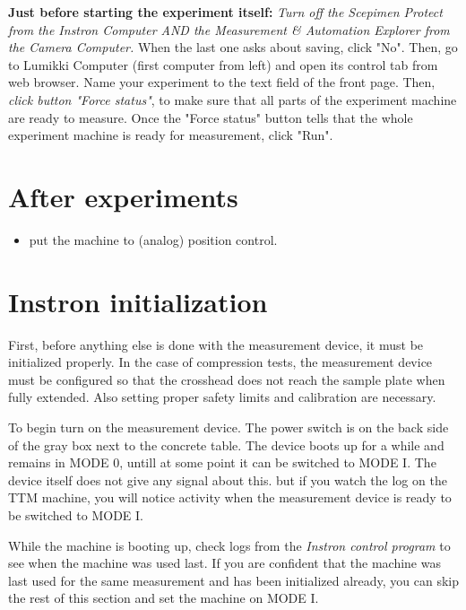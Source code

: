 \documentclass[a4paper]{article}
\begin{document}
\textbf{Just before starting the experiment itself:} \emph{Turn off the Scepimen 
Protect from the Instron Computer AND the Measurement \& Automation Explorer from 
the Camera Computer.} When the last one asks about saving, click "No". Then, go to 
Lumikki Computer (first computer from left) and open its control tab from web browser. 
Name your experiment to the text field of the front page. Then, \emph{click button 
"Force status"}, to make sure that all parts of the experiment machine are ready to 
measure. Once the "Force status" button tells that the whole experiment machine is 
ready for measurement, click "Run".

\section{After experiments}

\begin{itemize}
  \item put the machine to (analog) position control.
\end{itemize}


\section{Instron initialization}

First, before anything else is done with the measurement device, it
must be initialized properly. In the case of compression tests, the
measurement device must be configured so that the crosshead does not
reach the sample plate when fully extended. Also setting proper safety
limits and calibration are necessary.


To begin turn on the measurement device. The power switch is on the
back side of the gray box next to the concrete table. The device boots
up for a while and remains in \textsf{MODE 0}, untill at some point it
can be switched to \textsf{MODE I}. The device itself does not give
any signal about this. but if you watch the log on the TTM machine,
you will notice activity when the measurement device is ready to be
switched to \textsf{MODE I}.

While the machine is booting up, check logs from the {\it Instron
control program} to see when the machine was used last. If you are
confident that the machine was last used for the same measurement and
has been initialized already, you can skip the rest of this section
and set the machine on \textsf{MODE I}.
\end{document}
